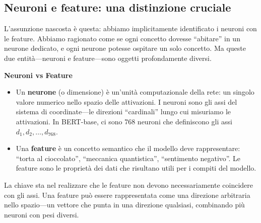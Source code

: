 \subsection{Neuroni e feature: una distinzione cruciale}
\label{subsec:neuroni_feature}
L'assunzione nascosta è questa: abbiamo implicitamente identificato i neuroni con le feature. Abbiamo ragionato come se ogni concetto dovesse ``abitare'' in un neurone dedicato, e ogni neurone potesse ospitare un solo concetto. Ma queste due entità—neuroni e feature—sono oggetti profondamente diversi.
\begin{notebox}
\textbf{Neuroni vs Feature}
\begin{itemize}
    \item Un \textbf{neurone} (o dimensione) è un'unità computazionale della rete: un singolo valore numerico nello spazio delle attivazioni. I neuroni sono gli assi del sistema di coordinate—le direzioni ``cardinali'' lungo cui misuriamo le attivazioni. In BERT-base, ci sono 768 neuroni che definiscono gli assi $d_1, d_2, \dots, d_{768}$.    
    \item Una \textbf{feature} è un concetto semantico che il modello deve rappresentare: ``torta al cioccolato'', ``meccanica quantistica'', ``sentimento negativo''. Le feature sono le proprietà dei dati che risultano utili per i compiti del modello.
\end{itemize}
\end{notebox}
La chiave sta nel realizzare che le feature non devono necessariamente coincidere con gli assi. Una feature può essere rappresentata come una direzione arbitraria nello spazio—un vettore che punta in una direzione qualsiasi, combinando più neuroni con pesi diversi.
